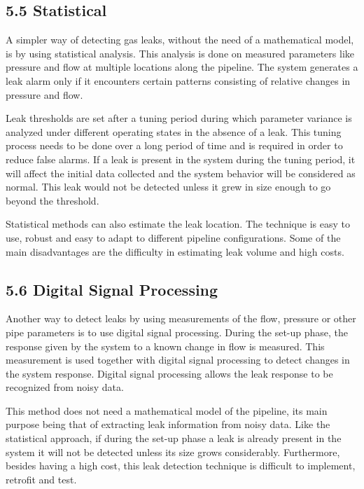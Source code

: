 \subsection*{5.5 Statistical}

A simpler way of detecting gas leaks, without the need of a mathematical model, is by using statistical analysis. This analysis is done on measured parameters like pressure and flow at multiple locations along the pipeline. The system generates a leak alarm only if it encounters certain patterns consisting of relative changes in pressure and flow.

Leak thresholds are set after a tuning period during which parameter variance is analyzed under different operating states in the absence of a leak. This tuning process needs to be done over a long period of time and is required in order to reduce false alarms. If a leak is present in the system during the tuning period, it will affect the initial data collected and the system behavior will be considered as normal. This leak would not be detected unless it grew in size enough to go beyond the threshold.

Statistical methods can also estimate the leak location. The technique is easy to use, robust and easy to adapt to different pipeline configurations. Some of the main disadvantages are the difficulty in estimating leak volume and high costs.

\subsection*{5.6 Digital Signal Processing}

Another way to detect leaks by using measurements of the flow, pressure or other pipe parameters is to use digital signal processing. During the set-up phase, the response given by the system to a known change in flow is measured. This measurement is used together with digital signal processing to detect changes in the system response. Digital signal processing allows the leak response to be recognized from noisy data.

This method does not need a mathematical model of the pipeline, its main purpose being that of extracting leak information from noisy data. Like the statistical approach, if during the set-up phase a leak is already present in the system it will not be detected unless its size grows considerably. Furthermore, besides having a high cost, this leak detection technique is difficult to implement, retrofit and test.

